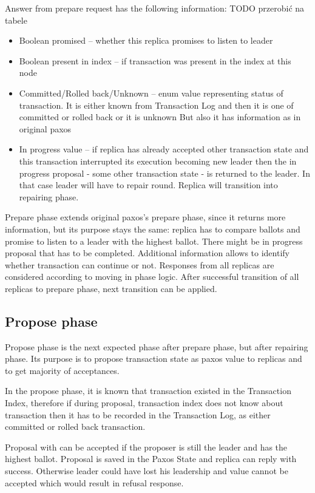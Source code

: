 Answer from prepare request has the following information:
TODO przerobić na tabele
\begin{itemize}
\item Boolean promised -- whether this replica promises to listen to leader
\item Boolean present in index -- if transaction was present in the index at this node
\item Committed/Rolled back/Unknown -- enum value representing status of transaction. It is either known from Transaction Log and then it is one of committed or rolled back or it is unknown
But also it has information as in original paxos
\item In progress value -- if replica has already accepted other transaction state and this transaction interrupted its execution becoming new leader then the in progress proposal - some other transaction state - is returned to the leader. In that case leader will have to repair \mpt round. Replica will transition into repairing phase.
\end{itemize}


Prepare phase extends original paxos’s prepare phase, since it returns more information, but its purpose stays the same: replica has to compare ballots and promise to listen to a leader with the highest ballot. 
There might be in progress proposal that has to be completed. Additional information allows to identify whether transaction can continue or not. Responses from all replicas are considered according to moving in phase logic.
After successful transition of all replicas to prepare phase, next transition can be applied.


\subsection{Propose phase}
Propose phase is the next expected phase after prepare phase, but after repairing phase. Its purpose is to propose transaction state as paxos value to replicas and to get majority of acceptances. 

In the propose phase, it is known that transaction existed in the Transaction Index, therefore if during proposal,  transaction index does not know about transaction then it has to be recorded in the Transaction Log, as either committed or rolled back transaction.

Proposal with \txState can be accepted if the proposer is still the leader and has the highest ballot. Proposal is saved in the Paxos State and replica can reply with success. Otherwise leader could have lost his leadership and value cannot be accepted which would result in refusal response.

